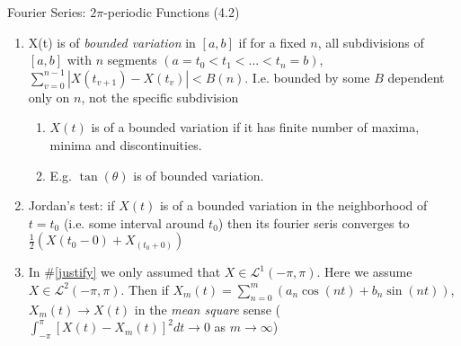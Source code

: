 \documentclass{article}
\newcommand{\intpi}{\int_{-\pi}^{\pi}}
\begin{document}
\begin{section}{Fourier Series: $2\pi$-periodic Functions (4.2)}
\begin{enumerate}
\begin{enumerate}
  \[ 
    |a_{m}| \leq \intpi |X(t)| |\cos(mt)| dt \leq \intpi |X(t)| dt \leq \infty
  \]

  \item Question set 1:
    \begin{enumerate}
    \item Can any $2\pi$-periodic function be represented as 
    $f(t) = \frac{1}{2}a_{0} + \sum_{n=1}^{\infty}(a_{n} \cos(nt) + 
                                                   b_{n} \sin(nt))$
    \item Term by term integration ok in the expansion of $f(t)$ above? This
    \emph{problem} can be fixed by assuming RHS uniformly converges.
    \end{enumerate}

  \item Question set 2, given $\{a_{n}\}$, $\{b_{n}\}$ defined in 
  \#\ref{formula1}
    \begin{enumerate}
    \item Are they finite? Yes if $\intpi |X(t)| dt < \infty$.
    \item Does it converge?
    \item Does it converge to $X(t)$ ?
    \end{enumerate}
  \end{enumerate}  

\item X(t) is of \emph{bounded variation} in $[a, b]$ if for a fixed $n$,
all subdivisions of $[a, b]$ with $n$ segments 
$(a = t_{0} < t_{1} < ... < t_{n} = b)$, 
$\sum_{v=0}^{n-1} |X(t_{v+1}) - X(t_{v})| < B(n)$. I.e. bounded by some
$B$ dependent only on $n$, not the specific subdivision
  \begin{enumerate}
  \item $X(t)$ is of a bounded variation if it has finite number of maxima,
  minima and discontinuities.
  \item E.g. $\tan(\theta)$ is of bounded variation.
  \end{enumerate}

\item Jordan's test: if $X(t)$ is of a bounded variation in the neighborhood
of $t = t_{0}$ (i.e. some interval around $t_{0}$) then its fourier seris 
converges to $\frac{1}{2}(X(t_{0}-0) + X_(t_{0}+0))$

\item In \#\ref{justify} we only assumed that $X \in \mathcal{L}^{1}(-\pi,\pi)$.
Here we assume $X \in \mathcal{L}^{2}(-\pi,\pi)$. Then if 
$X_{m}(t) = \sum_{n=0}^{m}(a_{n}\cos(nt) + b_{n}\sin(nt))$, 
$X_{m}(t) \rightarrow X(t)$ in the \emph{mean square} sense 
($\intpi [X(t) - X_{m}(t)]^{2} dt \rightarrow 0$ as $m \rightarrow \infty$)
\end{enumerate}
\end{section}
\end{document}
